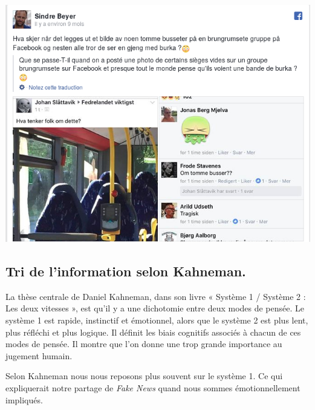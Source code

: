 \documentclass[11pt,a4paper,oldfontcommands]{memoir}
\begin{document}
\begin{center}
 \includegraphics[scale=0.50]{../../img/femmes_musulmanes.png}
 \label{femmes_musulmanes}
\end{center}



\subsection{Tri de l'information selon Kahneman.}
La thèse centrale de Daniel Kahneman, dans son livre « Système 1 / Système 2 : Les deux vitesses », est qu'il y a une dichotomie entre deux modes de pensée.
Le système 1 est rapide, instinctif et émotionnel, alors que le système 2 est plus lent, plus réfléchi et plus logique.
Il définit les biais cognitifs associés à chacun de ces modes de pensée.
Il montre que l'on donne une trop grande importance au jugement humain.

Selon Kahneman nous nous reposons plus souvent sur le système 1.
Ce qui expliquerait notre partage de \textit{Fake News} quand nous sommes émotionnellement impliqués.
\end{document}
